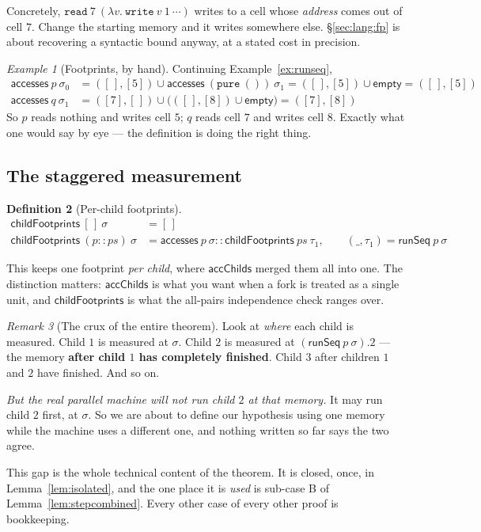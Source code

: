 \documentclass[11pt,a4paper]{article}
\theoremstyle{definition}
\newtheorem{definition}{Definition}
\theoremstyle{plain}
\theoremstyle{remark}
\newtheorem{remark}[definition]{Remark}
\newtheorem{example}[definition]{Example}
\newcommand{\st}{\sigma}
\newcommand{\acc}{\mathsf{accesses}}
\newcommand{\runSeq}{\mathsf{runSeq}}
\begin{document}
Concretely, $\texttt{read}\ 7\ (\lambda v.\ \texttt{write}\ v\ 1\ \cdots)$ writes to a cell
whose \emph{address} comes out of cell $7$. Change the starting memory and it writes
somewhere else. \S\ref{sec:lang:fp} is about recovering a syntactic bound anyway, at a
stated cost in precision.

\begin{example}[Footprints, by hand]\label{ex:acc}
Continuing Example~\ref{ex:runseq},
\begin{align*}
  \acc\ p\ \st_0 &= ([\,],[5]) \cup \acc\ (\texttt{pure}\ ())\ \st_1 = ([\,],[5]) \cup \mathsf{empty} = ([\,],[5]) \\
  \acc\ q\ \st_1 &= ([7],[\,]) \cup \bigl( ([\,],[8]) \cup \mathsf{empty} \bigr) = ([7],[8])
\end{align*}
So $p$ reads nothing and writes cell $5$; $q$ reads cell $7$ and writes cell $8$. Exactly
what one would say by eye --- the definition is doing the right thing.
\end{example}

\subsection{The staggered measurement}\label{sec:indep:stagger}

\begin{definition}[Per-child footprints]\label{def:childfootprints}
\begin{align*}
  \mathsf{childFootprints}\ [\,]\ \st &= [\,] \\
  \mathsf{childFootprints}\ (p :: ps)\ \st &= \acc\ p\ \st :: \mathsf{childFootprints}\ ps\ \tau_1,
    \qquad (\_,\tau_1) = \runSeq\ p\ \st
\end{align*}
\end{definition}

This keeps one footprint \emph{per child}, where $\mathsf{accChilds}$ merged them all into
one. The distinction matters: $\mathsf{accChilds}$ is what you want when a fork is treated as
a single unit, and $\mathsf{childFootprints}$ is what the all-pairs independence check ranges
over.

\begin{remark}[The crux of the entire theorem]\label{rem:stagger}
Look at \emph{where} each child is measured. Child $1$ is measured at $\st$. Child $2$ is
measured at $(\runSeq\ p\ \st).2$ --- the memory \textbf{after child $1$ has completely
finished}. Child $3$ after children $1$ and $2$ have finished. And so on.

\emph{But the real parallel machine will not run child $2$ at that memory.} It may run child
$2$ first, at $\st$. So we are about to define our hypothesis using one memory while the
machine uses a different one, and nothing written so far says the two agree.

This gap is the whole technical content of the theorem. It is closed, once, in
Lemma~\ref{lem:isolated}, and the one place it is \emph{used} is sub-case B of
Lemma~\ref{lem:stepcombined}. Every other case of every other proof is bookkeeping.
\end{remark}
\end{document}
